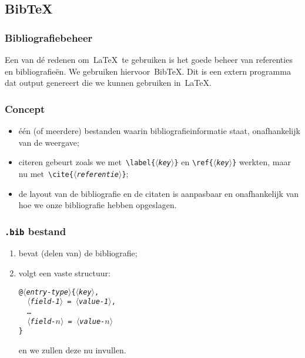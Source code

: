 \subsection{Bib\TeX}
\begin{frame}
  \frametitle{Bibliografiebeheer}

  Een van d\'e redenen om~\LaTeX\ te gebruiken is het goede beheer van referenties en bibliografie\"en. We gebruiken hiervoor~Bib\TeX. Dit is een extern programma dat output genereert die we kunnen gebruiken in~\LaTeX.
\end{frame}

\begin{frame}
  \frametitle{Concept}

  \begin{itemize}
  	\item \'e\'en (of meerdere) bestanden waarin bibliografie\-informatie staat, onafhankelijk van de weergave;
    \item citeren gebeurt zoals we met~\texttt{\textcolor{uagreen}{\textbackslash label}\{$\langle$\textsl{key}$\rangle$\}} en \texttt{\textcolor{uagreen}{\textbackslash ref}\{$\langle$\textsl{key}$\rangle$\}} werkten, maar nu met~\texttt{\textcolor{uagreen}{\textbackslash cite}\{$\langle$\textsl{referentie}$\rangle$\}};
  	\item de layout van de bibliografie en de citaten is aanpasbaar en onafhankelijk van hoe we onze bibliografie hebben opgeslagen.
  \end{itemize}
\end{frame}

\begin{frame}
  \frametitle{\texttt{.bib} bestand}

  \begin{enumerate}
	\item bevat (delen van) de bibliografie;
	\item volgt een vaste structuur:

	  \texttt{@\textsl{$\langle$entry-type$\rangle$}\{\textsl{$\langle$key$\rangle$},\\
	  \ \ \textsl{$\langle$field-1$\rangle$} = \textsl{$\langle$value-1$\rangle$}, \\
	  \ \ \ldots \\
	  \ \ \textsl{$\langle$field-$n\rangle$} = \textsl{$\langle$value-$n\rangle$} \\
	  \}}
	  
	  en we zullen deze nu invullen.
  \end{enumerate}
\end{frame}

